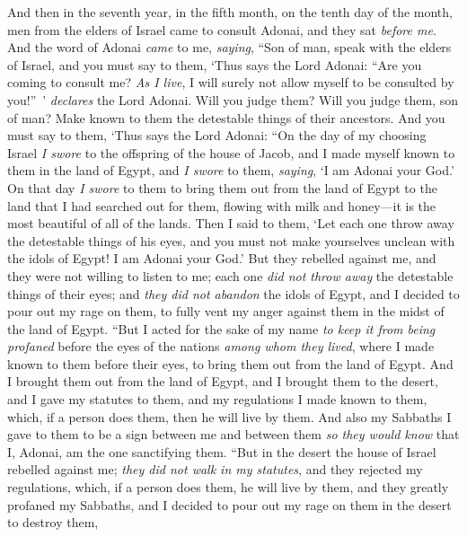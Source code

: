 \begin{biblechapter} %
 And then in the seventh year, in the fifth month, on the tenth day of the month, men from the elders of Israel came to consult Adonai, and they sat \textit{before me}.
\verse And the word of Adonai \textit{came} to me, \textit{saying},
\verse “Son of man, speak with the elders of Israel, and you must say to them, ‘Thus says the Lord Adonai: “Are you coming to consult me? \textit{As I live}, I will surely not allow myself to be consulted by you!” ’ \textit{declares} the Lord Adonai.
\verse Will you judge them? Will you judge them, son of man? Make known to them the detestable things of their ancestors.
\verse And you must say to them, ‘Thus says the Lord Adonai: “On the day of my choosing Israel \textit{I swore} to the offspring of the house of Jacob, and I made myself known to them in the land of Egypt, and \textit{I swore} to them, \textit{saying}, ‘I am Adonai your God.’
\verse On that day \textit{I swore} to them to bring them out from the land of Egypt to the land that I had searched out for them, flowing with milk and honey—it is the most beautiful of all of the lands.
\verse Then I said to them, ‘Let each one throw away the detestable things of his eyes, and you must not make yourselves unclean with the idols of Egypt! I am Adonai your God.’
\verse But they rebelled against me, and they were not willing to listen to me; each one \textit{did not throw away} the detestable things of their eyes; and \textit{they did not abandon} the idols of Egypt, and I decided to pour out my rage on them, to fully vent my anger against them in the midst of the land of Egypt.
\verse “But I acted for the sake of my name \textit{to keep it from being profaned} before the eyes of the nations \textit{among whom they lived}, where I made known to them before their eyes, to bring them out from the land of Egypt.
\verse And I brought them out from the land of Egypt, and I brought them to the desert,
\verse and I gave my statutes to them, and my regulations I made known to them, which, if a person does them, then he will live by them.
\verse And also my Sabbaths I gave to them to be a sign between me and between them \textit{so they would know} that I, Adonai, am the one sanctifying them.
\verse “But in the desert the house of Israel rebelled against me; \textit{they did not walk in my statutes}, and they rejected my regulations, which, if a person does them, he will live by them, and they greatly profaned my Sabbaths, and I decided to pour out my rage on them in the desert to destroy them,

\end{biblechapter}

